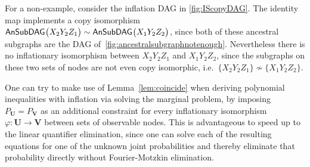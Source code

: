 For a non-example, consider the inflation DAG in \cref{fig:IScopyDAG}. The identity map implements a copy isomorphism ${\operatorname{\mathsf{AnSubDAG}}_{}}\bigl\lparen X_2 Y_2 Z_1\bigr\rparen\sim{\operatorname{\mathsf{AnSubDAG}}_{}}\bigl\lparen X_1 Y_2 Z_2\bigr\rparen$, since both of these ancestral subgraphs are the DAG of~\cref{fig:ancestralsubgraphnotenough}. Nevertheless there is no inflationary isomorphism between ${X_2 Y_2 Z_1}$ and ${X_1 Y_2 Z_2}$, since the subgraphs on these two sets of nodes are not even copy isomorphic, i.e.~$\{X_2Y_2 Z_1\}\not\sim\{X_1 Y_2 Z_2\}$.




One can try to make use of Lemma~\ref{lem:coincide} when deriving polynomial inequalities with inflation via solving the marginal problem, by imposing $P_{\bm{U}} = P_{\bm{V}}$ as an additional constraint for every inflationary isomorphism $\varphi : \bm{U}\to\bm{V}$ between sets of observable nodes. This is advantageous to speed up to the linear quantifier elimination, since one can solve each of the resulting equations for one of the unknown joint probabilities and thereby eliminate that probability directly without Fourier-Motzkin elimination.

